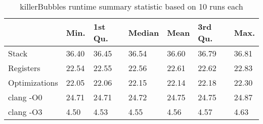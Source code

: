 \begin{table}[h!]
\centering
\begin{tabular}{p{}p{}p{}p{}p{}p{}p{}}
  \hline
 & Min. & 1st Qu. & Median & Mean & 3rd Qu. & Max. \\ 
  \hline
Stack & 36.40 & 36.45 & 36.54 & 36.60 & 36.79 & 36.81 \\ 
  Registers & 22.54 & 22.55 & 22.56 & 22.61 & 22.62 & 22.83 \\ 
  Optimizations & 22.05 & 22.06 & 22.15 & 22.14 & 22.18 & 22.30 \\ 
  clang -O0 & 24.71 & 24.71 & 24.72 & 24.75 & 24.75 & 24.87 \\ 
  clang -O3 & 4.50 & 4.53 & 4.55 & 4.56 & 4.57 & 4.63 \\ 
   \hline
\end{tabular}
\caption{killerBubbles runtime summary statistic based on 10 runs each}
\end{table}
